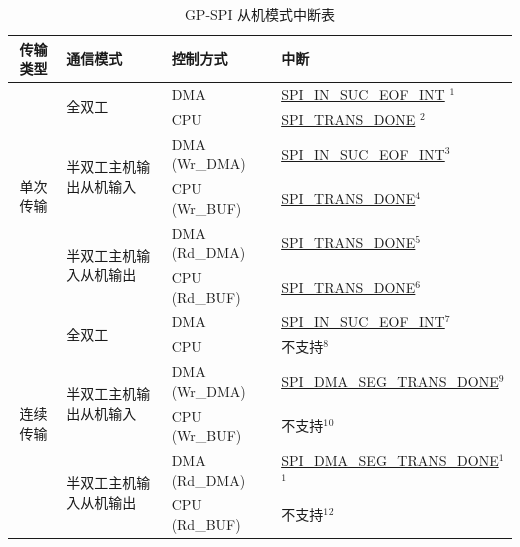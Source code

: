 \documentclass[main\_\_CN.tex]{subfiles}
\begin{document}
\begin{longtable}[c]{|c|l|l|l|}
\caption{GP-SPI 从机模式中断表}
\label{Table:Slv_Int_Table}\\
\hline
\rowcolor{lightgray}
传输类型  & 通信模式 & 控制方式 & 中断 \\ \hline
\endhead
\multirow{6}{*}{单次传输} & \multirow{2}{*}{全双工} & DMA & \hyperref[int:SPIINSUCEOFINT]{SPI\_IN\_SUC\_EOF\_INT} \hyperref[slave-note-1]{$^1$} \\ \cline{3-4}
&& CPU & \hyperref[fielddesc:SPITRANSDONE]{SPI\_TRANS\_DONE} \hyperref[slave-note-2]{$^2$}  \\ \cline{2-4}
& \multirow{2}{*}{半双工主机输出从机输入} & DMA (Wr\_DMA) & \hyperref[int:SPIINSUCEOFINT]{SPI\_IN\_SUC\_EOF\_INT}\hyperref[slave-note-3]{$^3$}\\ \cline{3-4}
&& CPU (Wr\_BUF) & \hyperref[fielddesc:SPITRANSDONE]{SPI\_TRANS\_DONE}\hyperref[slave-note-4]{$^4$}  \\ \cline{2-4}
& \multirow{2}{*}{半双工主机输入从机输出} & DMA (Rd\_DMA) & \hyperref[fielddesc:SPITRANSDONE]{SPI\_TRANS\_DONE}\hyperref[slave-note-5]{$^5$} \\ \cline{3-4}
&& CPU (Rd\_BUF) & \hyperref[fielddesc:SPITRANSDONE]{SPI\_TRANS\_DONE}\hyperref[slave-note-6]{$^6$} \\ \hline
\multirow{6}{*}{连续传输} & \multirow{2}{*}{全双工} & DMA & \hyperref[int:SPIINSUCEOFINT]{SPI\_IN\_SUC\_EOF\_INT}\hyperref[slave-note-7]{$^7$} \\ \cline{3-4}
&& CPU & 不支持\hyperref[slave-note-8]{$^8$} \\ \cline{2-4}
& \multirow{2}{*}{半双工主机输出从机输入} & DMA (Wr\_DMA)  & \hyperref[fielddesc:SPIDMASEGTRANSDONE]{SPI\_DMA\_SEG\_TRANS\_DONE}\hyperref[slave-note-9]{$^9$} \\ \cline{3-4}
&& CPU (Wr\_BUF)           & 不支持\hyperref[slave-note-10]{$^1$$^0$}       \\ \cline{2-4}
& \multirow{2}{*}{半双工主机输入从机输出} & DMA (Rd\_DMA) & \hyperref[fielddesc:SPIDMASEGTRANSDONE]{SPI\_DMA\_SEG\_TRANS\_DONE}\hyperref[slave-note-11]{$^1$$^1$} \\ \cline{3-4}
&& CPU (Rd\_BUF) & 不支持\hyperref[slave-note-12]{$^1$$^2$}       \\ \hline
\end{longtable}
\end{document}
